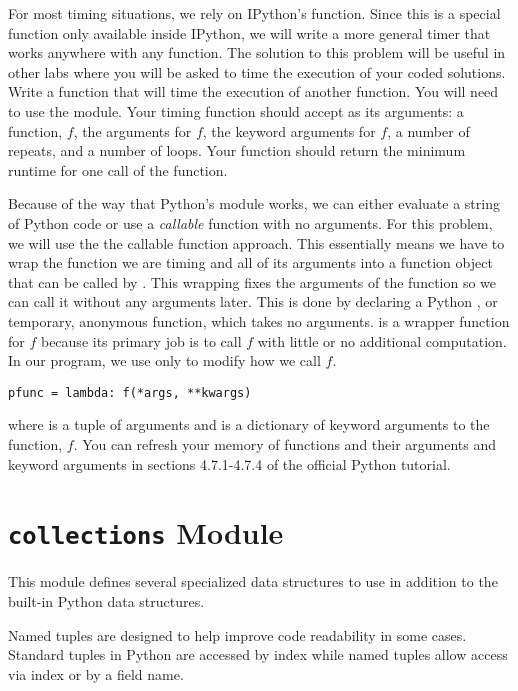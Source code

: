 \begin{problem}
For most timing situations, we rely on IPython's  function.
Since this is a special function only available inside IPython, we will write a more general timer that works anywhere with any function.
The solution to this problem will be useful in other labs where you will be asked to time the execution of your coded solutions.
Write a function that will time the execution of another function.
You will need to use the  module.
Your timing function should accept as its arguments: a function, $f$, the arguments for $f$, the keyword arguments for $f$, a number of repeats, and a number of loops.
Your function should return the minimum runtime for one call of the function.

Because of the way that Python's  module works, we can either evaluate a string of Python code or use a \emph{callable} function with no arguments.  
For this problem, we will use the the callable function approach.
This essentially means we have to wrap the function we are timing and all of its arguments into a function object that can be called by .
This wrapping fixes the arguments of the function so we can call it without any arguments later.
This is done by declaring a Python , or temporary, anonymous  function, which takes no arguments.   is a wrapper function for $f$ because its primary job is to call $f$ with little or no additional computation.
In our program, we use  only to modify how we call $f$.
\begin{lstlisting}
pfunc = lambda: f(*args, **kwargs)
\end{lstlisting}
where  is a tuple of arguments and  is a dictionary of keyword arguments to the function, $f$.
You can refresh your memory of functions and their arguments and keyword arguments in sections 4.7.1-4.7.4 of the official Python tutorial.
\end{problem}

\section*{\texttt{collections} Module}
This module defines several specialized data structures to use in addition to the built-in Python data structures.

Named tuples are designed to help improve code readability in some cases.
Standard tuples in Python are accessed by index while named tuples allow access via index or by a field name.

